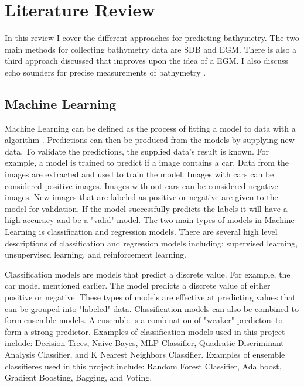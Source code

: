 \section{Literature Review}
\setlength{\parindent}{10ex}
In this review I cover the different approaches for predicting bathymetry.
The two main methods for collecting bathymetry data are \ac{SDB} and \ac{EGM}.
There is also a third approach discussed that improves upon the idea of a \ac{EGM}.
I also discuss echo sounders for precise measurements of bathymetry \cite{farr1980multibeam}.

\subsection{Machine Learning}
Machine Learning can be defined as the process of fitting a model to data with a algorithm \cite{bishop2006pattern}.
Predictions can then be produced from the models by supplying new data.
To validate the predictions, the supplied data's result is known.
For example, a model is trained to predict if a image contains a car.
Data from the images are extracted and used to train the model.
Images with cars can be considered positive images.
Images with out cars can be considered negative images.
New images that are labeled as positive or negative are given to the model for validation.
If the model successfully predicts the labels it will have a high accuracy and be a "valid" model.
The two main types of models in Machine Learning is classification and regression models.
There are several high level descriptions of classification and regression models including: supervised learning, unsupervised learning, and reinforcement learning.

\par
Classification models are models that predict a discrete value.
For example, the car model mentioned earlier.
The model predicts a discrete value of either positive or negative.
These types of models are effective at predicting values that can be grouped into "labeled" data.
Classification models can also be combined to form ensemble models.
A ensemble is a combination of "weaker" predictors to form a strong predictor.
Examples of classification models used in this project include: Decision Trees, Naive Bayes, MLP Classifier, Quadratic Discriminant Analysis Classifier, and K Nearest Neighbors Classifier.
Examples of ensemble classifieres used in this project include: Random Forest Classifier, Ada boost, Gradient Boosting, Bagging, and Voting.

